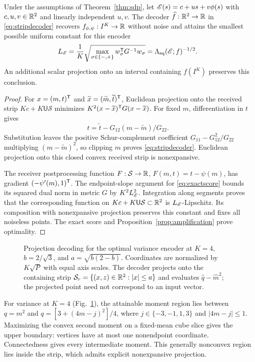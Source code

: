 \begin{theorem}\label{thm:decoder}
Under the assumptions of Theorem~\ref{thm:sdp}, let $\mathscr E(s)=c+us+v\phi(s)$ with $c,u,v\in\mathbb R^2$ and linearly independent $u,v$. The decoder $\widehat f:\mathbb R^2\to\mathbb R$ in \eqref{eq:stripdecoder} recovers $f_{\phi,\psi}:I^K\to\mathbb R$ without noise and attains the smallest possible uniform constant for this encoder
\begin{equation}
 L_\mathscr E=\frac1K\sqrt{\max_{\sigma\in\{-,+\}}w_\sigma^\mathsf T G^{-1}w_\sigma}
 =\Lambda_{\mathrm{sq}}(\mathscr E;f)^{-1/2}.
 \label{eq:decoderconstant}
\end{equation}
An additional scalar projection onto an interval containing $f(I^K)$ preserves this conclusion.
\end{theorem}
\begin{proof}
For $x=(m,t)^\mathsf T$ and $\widetilde x=(\widetilde m,\widetilde t)^\mathsf T$, Euclidean projection onto the received strip $Kc+K\mathsf U\mathcal S$ minimizes $K^2(x-\widetilde x)^\mathsf T G(x-\widetilde x)$. For fixed $m$, differentiation in $t$ gives
$$t=\widetilde t-G_{12}(m-\widetilde m)/G_{22}.$$
Substitution leaves the positive Schur-complement coefficient $G_{11}-G_{12}^2/G_{22}$ multiplying $(m-\widetilde m)^2$, so clipping $m$ proves \eqref{eq:stripdecoder}. Euclidean projection onto this closed convex received strip is nonexpansive.

The receiver postprocessing function $F:\mathcal S\to\mathbb R$, $F(m,t)=t-\psi(m)$, has gradient $(-\psi'(m),1)^\mathsf T$. The endpoint-slope argument for \eqref{eq:exactscore} bounds its squared dual norm in metric $G$ by $K^2L_\mathscr E^2$. Integration along segments proves that the corresponding function on $Kc+K\mathsf U\mathcal S\subset\mathbb R^2$ is $L_\mathscr E$-Lipschitz. Its composition with nonexpansive projection preserves this constant and fixes all noiseless points. The exact score and Proposition~\ref{prop:amplification} prove optimality.
\end{proof}

\begin{figure}[t]
 \centering{}
 \caption{Projection decoding for the optimal variance encoder at $K=4$, $b=2/\sqrt3$, and $a=\sqrt{b(2-b)}$. Coordinates are normalized by $K\sqrt P$ with equal axis scales. The decoder projects onto the containing strip $\mathcal S_r=\{(x,z)\in\mathbb R^2:|x|\le a\}$ and evaluates $\widehat q-\widehat m^2$; the projected point need not correspond to an input vector.}
 \label{fig:decoder-geometry}
\end{figure}
For variance at $K=4$ (Fig.~\ref{fig:decoder-geometry}), the attainable moment region lies between $q=m^2$ and $q=[3+(4m-j)^2]/4$, where $j\in\{-3,-1,1,3\}$ and $|4m-j|\le1$. Maximizing the convex second moment on a fixed-mean cube slice gives the upper boundary: vertices have at most one nonendpoint coordinate. Connectedness gives every intermediate moment. This generally nonconvex region lies inside the strip, which admits explicit nonexpansive projection.

